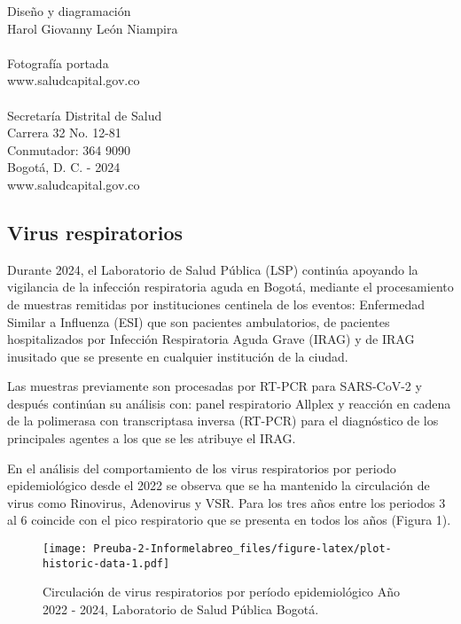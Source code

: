 \documentclass[
]{article}
\begin{document}
\begin{center}
{\color{colortitles} Diseño y diagramación\\}
Harol Giovanny León Niampira\\~\\


{\color{colortitles} Fotografía portada\\}
www.saludcapital.gov.co\\~\\


{\color{colortitles}
Secretaría Distrital de Salud\\
Carrera 32 No. 12-81\\
Conmutador: 364 9090\\
Bogotá, D. C. - 2024\\
www.saludcapital.gov.co\\}
\end{center}


\newpage

\begin{flushleft}
{\color{colortitles} \section{Virus respiratorios}}
\end{flushleft}

Durante 2024, el Laboratorio de Salud Pública (LSP) continúa apoyando la
vigilancia de la infección respiratoria aguda en Bogotá, mediante el
procesamiento de muestras remitidas por instituciones centinela de los
eventos: Enfermedad Similar a Influenza (ESI) que son pacientes
ambulatorios, de pacientes hospitalizados por Infección Respiratoria
Aguda Grave (IRAG) y de IRAG inusitado que se presente en cualquier
institución de la ciudad.

Las muestras previamente son procesadas por RT-PCR para SARS-CoV-2 y
después continúan su análisis con: panel respiratorio Allplex y reacción
en cadena de la polimerasa con transcriptasa inversa (RT-PCR) para el
diagnóstico de los principales agentes a los que se les atribuye el
IRAG.

En el análisis del comportamiento de los virus respiratorios por periodo
epidemiológico desde el 2022 se observa que se ha mantenido la
circulación de virus como Rinovirus, Adenovirus y VSR. Para los tres
años entre los periodos 3 al 6 coincide con el pico respiratorio que se
presenta en todos los años (Figura 1).

\begin{figure}
\centering
\texttt{[image: Preuba-2-Informelabreo\_files/figure-latex/plot-historic-data-1.pdf]}
\caption{Circulación de virus respiratorios por período epidemiológico
Año 2022 - 2024, Laboratorio de Salud Pública Bogotá.}
\end{figure}
\end{document}
